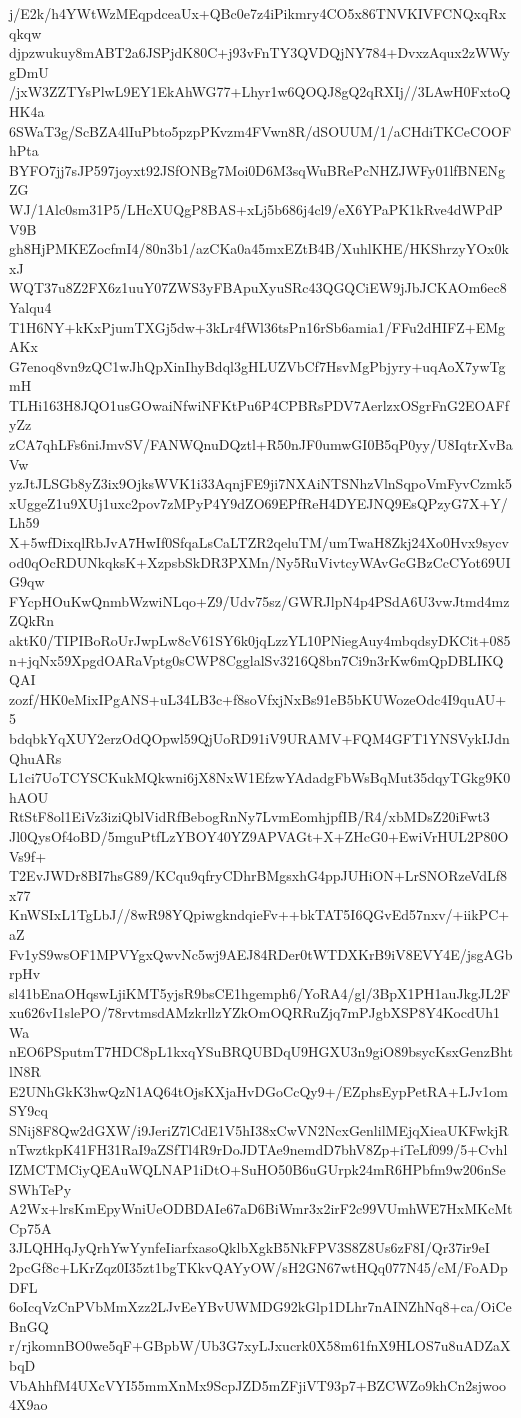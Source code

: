 j/E2k/h4YWtWzMEqpdceaUx+QBc0e7z4iPikmry4CO5x86TNVKIVFCNQxqRxqkqw
djpzwukuy8mABT2a6JSPjdK80C+j93vFnTY3QVDQjNY784+DvxzAqux2zWWygDmU
/jxW3ZZTYsPlwL9EY1EkAhWG77+Lhyr1w6QOQJ8gQ2qRXIj//3LAwH0FxtoQHK4a
6SWaT3g/ScBZA4lIuPbto5pzpPKvzm4FVwn8R/dSOUUM/1/aCHdiTKCeCOOFhPta
BYFO7jj7sJP597joyxt92JSfONBg7Moi0D6M3sqWuBRePcNHZJWFy01lfBNENgZG
WJ/1Alc0sm31P5/LHcXUQgP8BAS+xLj5b686j4cl9/eX6YPaPK1kRve4dWPdPV9B
gh8HjPMKEZocfmI4/80n3b1/azCKa0a45mxEZtB4B/XuhlKHE/HKShrzyYOx0kxJ
WQT37u8Z2FX6z1uuY07ZWS3yFBApuXyuSRc43QGQCiEW9jJbJCKAOm6ec8Yalqu4
T1H6NY+kKxPjumTXGj5dw+3kLr4fWl36tsPn16rSb6amia1/FFu2dHIFZ+EMgAKx
G7enoq8vn9zQC1wJhQpXinIhyBdql3gHLUZVbCf7HsvMgPbjyry+uqAoX7ywTgmH
TLHi163H8JQO1usGOwaiNfwiNFKtPu6P4CPBRsPDV7AerlzxOSgrFnG2EOAFfyZz
zCA7qhLFs6niJmvSV/FANWQnuDQztl+R50nJF0umwGI0B5qP0yy/U8IqtrXvBaVw
yzJtJLSGb8yZ3ix9OjksWVK1i33AqnjFE9ji7NXAiNTSNhzVlnSqpoVmFyvCzmk5
xUggeZ1u9XUj1uxc2pov7zMPyP4Y9dZO69EPfReH4DYEJNQ9EsQPzyG7X+Y/Lh59
X+5wfDixqlRbJvA7HwIf0SfqaLsCaLTZR2qeluTM/umTwaH8Zkj24Xo0Hvx9sycv
od0qOcRDUNkqksK+XzpsbSkDR3PXMn/Ny5RuVivtcyWAvGcGBzCcCYot69UIG9qw
FYcpHOuKwQnmbWzwiNLqo+Z9/Udv75sz/GWRJlpN4p4PSdA6U3vwJtmd4mzZQkRn
aktK0/TIPIBoRoUrJwpLw8cV61SY6k0jqLzzYL10PNiegAuy4mbqdsyDKCit+085
n+jqNx59XpgdOARaVptg0sCWP8CgglalSv3216Q8bn7Ci9n3rKw6mQpDBLIKQQAI
zozf/HK0eMixIPgANS+uL34LB3c+f8soVfxjNxBs91eB5bKUWozeOdc4I9quAU+5
bdqbkYqXUY2erzOdQOpwl59QjUoRD91iV9URAMV+FQM4GFT1YNSVykIJdnQhuARs
L1ci7UoTCYSCKukMQkwni6jX8NxW1EfzwYAdadgFbWsBqMut35dqyTGkg9K0hAOU
RtStF8ol1EiVz3iziQblVidRfBebogRnNy7LvmEomhjpfIB/R4/xbMDsZ20iFwt3
Jl0QysOf4oBD/5mguPtfLzYBOY40YZ9APVAGt+X+ZHcG0+EwiVrHUL2P80OVs9f+
T2EvJWDr8BI7hsG89/KCqu9qfryCDhrBMgsxhG4ppJUHiON+LrSNORzeVdLf8x77
KnWSIxL1TgLbJ//8wR98YQpiwgkndqieFv++bkTAT5I6QGvEd57nxv/+iikPC+aZ
Fv1yS9wsOF1MPVYgxQwvNc5wj9AEJ84RDer0tWTDXKrB9iV8EVY4E/jsgAGbrpHv
sl41bEnaOHqswLjiKMT5yjsR9bsCE1hgemph6/YoRA4/gl/3BpX1PH1auJkgJL2F
xu626vI1slePO/78rvtmsdAMzkrllzYZkOmOQRRuZjq7mPJgbXSP8Y4KocdUh1Wa
nEO6PSputmT7HDC8pL1kxqYSuBRQUBDqU9HGXU3n9giO89bsycKsxGenzBhtlN8R
E2UNhGkK3hwQzN1AQ64tOjsKXjaHvDGoCcQy9+/EZphsEypPetRA+LJv1omSY9cq
SNij8F8Qw2dGXW/i9JeriZ7lCdE1V5hI38xCwVN2NcxGenlilMEjqXieaUKFwkjR
nTwztkpK41FH31RaI9aZSfTl4R9rDoJDTAe9nemdD7bhV8Zp+iTeLf099/5+Cvhl
IZMCTMCiyQEAuWQLNAP1iDtO+SuHO50B6uGUrpk24mR6HPbfm9w206nSeSWhTePy
A2Wx+lrsKmEpyWniUeODBDAIe67aD6BiWmr3x2irF2c99VUmhWE7HxMKcMtCp75A
3JLQHHqJyQrhYwYynfeIiarfxasoQklbXgkB5NkFPV3S8Z8Us6zF8I/Qr37ir9eI
2pcGf8c+LKrZqz0I35zt1bgTKkvQAYyOW/sH2GN67wtHQq077N45/cM/FoADpDFL
6oIcqVzCnPVbMmXzz2LJvEeYBvUWMDG92kGlp1DLhr7nAINZhNq8+ca/OiCeBnGQ
r/rjkomnBO0we5qF+GBpbW/Ub3G7xyLJxucrk0X58m61fnX9HLOS7u8uADZaXbqD
VbAhhfM4UXcVYI55mmXnMx9ScpJZD5mZFjiVT93p7+BZCWZo9khCn2sjwoo4X9ao

